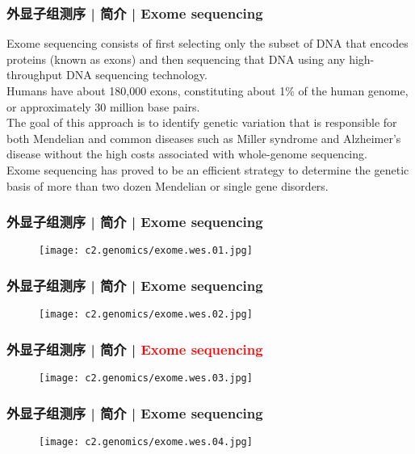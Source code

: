 \begin{frame}
  \frametitle{外显子组测序 | 简介 | Exome sequencing}
  Exome sequencing consists of first selecting only the subset of DNA that encodes proteins (known as exons) and then sequencing that DNA using any high-throughput DNA sequencing technology.\\
  \vspace{1em}
  Humans have about 180,000 exons, constituting about 1\% of the human genome, or approximately 30 million base pairs.\\
  \vspace{1em}
  The goal of this approach is to identify genetic variation that is responsible for both Mendelian and common diseases such as Miller syndrome and Alzheimer's disease without the high costs associated with whole-genome sequencing.\\
  \vspace{1em}
  Exome sequencing has proved to be an efficient strategy to determine the genetic basis of more than two dozen Mendelian or single gene disorders.
\end{frame}

\begin{frame}
  \frametitle{外显子组测序 | 简介 | Exome sequencing}
  \begin{figure}
    \centering
    \texttt{[image: c2.genomics/exome.wes.01.jpg]}
  \end{figure}
\end{frame}

\begin{frame}
  \frametitle{外显子组测序 | 简介 | Exome sequencing}
  \begin{figure}
    \centering
    \texttt{[image: c2.genomics/exome.wes.02.jpg]}
  \end{figure}
\end{frame}

\begin{frame}
  \frametitle{外显子组测序 | 简介 | \textcolor{red}{Exome sequencing}}
  \begin{figure}
    \centering
    \texttt{[image: c2.genomics/exome.wes.03.jpg]}
  \end{figure}
\end{frame}

\begin{frame}
  \frametitle{外显子组测序 | 简介 | Exome sequencing}
  \begin{figure}
    \centering
    \texttt{[image: c2.genomics/exome.wes.04.jpg]}
  \end{figure}
\end{frame}

